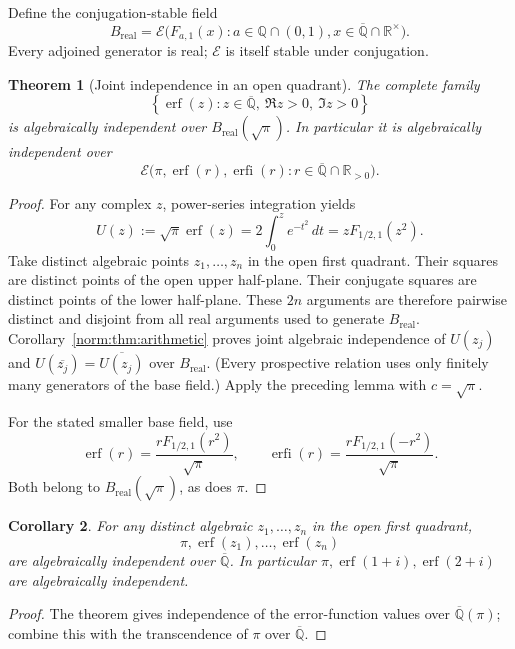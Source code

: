 \documentclass[11pt,a4paper]{article}
\newcommand{\Qbar}{\overline{\mathbb Q}}
\newcommand{\E}{\mathcal E}
\newtheorem{theorem}{Theorem}[section]
\newtheorem{corollary}[theorem]{Corollary}
\theoremstyle{definition}
\theoremstyle{remark}
\numberwithin{equation}{section}
\begin{document}
Define the conjugation-stable field
\[
 B_{\mathrm{real}}=\E\bigl(
 F_{a,1}(x):
 a\in\mathbb Q\cap(0,1),
 x\in\Qbar\cap\mathbb R^{\times}\bigr).
\]
Every adjoined generator is real; $\E$ is itself stable under
conjugation.

\begin{theorem}[Joint independence in an open quadrant]\label{norm:thm:quadrant}
The complete family
\[
 \left\{\operatorname{erf}(z):z\in\Qbar,
                 \ \Re z>0,\ \Im z>0\right\}
\]
is algebraically independent over $B_{\mathrm{real}}(\sqrt\pi)$.
In particular it is algebraically independent over
\[
 \E\bigl(\pi,
    \operatorname{erf}(r),\operatorname{erfi}(r):
    r\in\Qbar\cap\mathbb R_{>0}\bigr).
\]
\end{theorem}

\begin{proof}
For any complex $z$, power-series integration yields
\[
 U(z):=\sqrt\pi\operatorname{erf}(z)
   =2\int_0^z e^{-t^2}\,dt
   =zF_{1/2,1}(z^2).
\]
Take distinct algebraic points $z_1,\ldots,z_n$ in the open first
quadrant.  Their squares are distinct points of the open upper
half-plane.  Their conjugate squares are distinct points of the lower
half-plane.  These $2n$ arguments are therefore pairwise distinct and
disjoint from all real arguments used to generate $B_{\mathrm{real}}$.
Corollary~\ref{norm:thm:arithmetic} proves joint algebraic independence of
$U(z_j)$ and $U(\overline{z_j})=\overline{U(z_j)}$ over
$B_{\mathrm{real}}$.  (Every prospective relation uses only finitely
many generators of the base field.)  Apply the preceding lemma with
$c=\sqrt\pi$.

For the stated smaller base field, use
\[
 \operatorname{erf}(r)
    =\frac{rF_{1/2,1}(r^2)}{\sqrt\pi},\qquad
 \operatorname{erfi}(r)
    =\frac{rF_{1/2,1}(-r^2)}{\sqrt\pi}.
\]
Both belong to $B_{\mathrm{real}}(\sqrt\pi)$, as does $\pi$.
\end{proof}

\begin{corollary}
For any distinct algebraic $z_1,\ldots,z_n$ in the open first quadrant,
\[
 \pi,\operatorname{erf}(z_1),\ldots,\operatorname{erf}(z_n)
\]
are algebraically independent over $\Qbar$.
In particular $\pi,\operatorname{erf}(1+i),\operatorname{erf}(2+i)$
are algebraically independent.
\end{corollary}

\begin{proof}
The theorem gives independence of the error-function values over
$\Qbar(\pi)$; combine this with the transcendence of
$\pi$ over $\Qbar$.
\end{proof}
\end{document}
